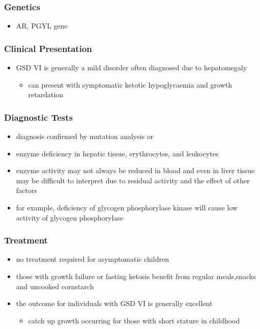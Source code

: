 \documentclass{scrartcl}
\begin{document}
\subsubsection{Genetics}
\label{sec:orgf8f9648}
\begin{itemize}
\item AR, PGYL gene
\end{itemize}

\subsubsection{Clinical Presentation}
\label{sec:org73ac980}
\begin{itemize}
\item GSD VI is generally a mild disorder often diagnosed due to hepatomegaly
\begin{itemize}
\item can present with symptomatic ketotic hypoglycaemia and growth retardation
\end{itemize}
\end{itemize}
\subsubsection{Diagnostic Tests}
\label{sec:orgcfe94c4}
\begin{itemize}
\item diagnosis confirmed by mutation analysis or
\item enzyme deficiency in hepatic tissue, erythrocytes, and leukocytes
\item enzyme activity may not always be reduced in blood and even in liver
tissue may be difficult to interpret due to residual activity and
the effect of other factors
\item for example, deficiency of glycogen phosphorylase kinase will cause
low activity of glycogen phosphorylase
\end{itemize}
\subsubsection{Treatment}
\label{sec:org32bda7e}
\begin{itemize}
\item no treatment required for asymptomatic children
\item those with growth failure or fasting ketosis benefit from regular
meals,snacks and uncooked cornstarch
\item the outcome for individuals with GSD VI is generally excellent
\begin{itemize}
\item catch up growth occurring for those with short stature in childhood
\end{itemize}
\end{itemize}
\end{document}
